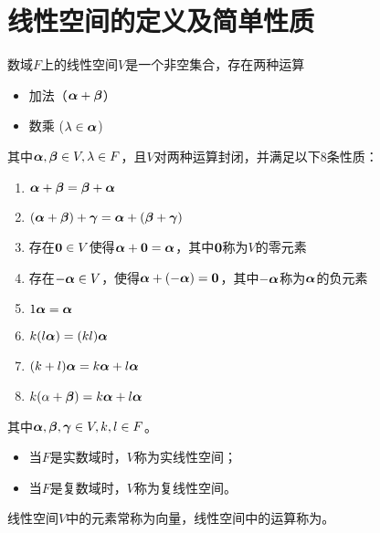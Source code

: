 
\section{线性空间的定义及简单性质}


\begin{frame}
\begin{dingyi}
数域$F$上的线性空间$V$是一个非空集合，存在两种运算
\begin{itemize}
\item 加法（$\boldsymbol{\alpha}+\boldsymbol{\beta}$）
\item 数乘 ($\lambda \in \boldsymbol{\alpha}$)
\end{itemize}
其中$\boldsymbol{\alpha},\boldsymbol{\beta} \in V, \lambda\in F$，且$V$对两种运算封闭，并满足以下$8$条性质：
\begin{enumerate}
\item $\boldsymbol{\alpha}+\boldsymbol{\beta}=\boldsymbol{\beta}+\boldsymbol{\alpha}$
\item $(\boldsymbol{\alpha}+\boldsymbol{\beta})+\boldsymbol{\gamma}=\boldsymbol{\alpha}+(\boldsymbol{\beta}+\boldsymbol{\gamma})$
\item 存在$\M0\in V$使得$\alphabd+\M0=\alphabd$，其中$\M0$称为$V$的零元素
\item 存在$-\boldsymbol{\alpha}\in V$，使得$\alphabd+(-\alphabd)=\M0$，其中$-\boldsymbol{\alpha}$称为$\boldsymbol{\alpha}$的负元素
\item $1\boldsymbol{\alpha} = \boldsymbol{\alpha}$
\item $k(l\boldsymbol{\alpha}) = (kl)\boldsymbol{\alpha}$
\item $(k+l)\boldsymbol{\alpha} = k\boldsymbol{\alpha} + l\boldsymbol{\alpha}$
\item $k(\alpha+\boldsymbol{\beta}) = k \boldsymbol{\alpha} + l \boldsymbol{\alpha}$
\end{enumerate}
其中$\boldsymbol{\alpha},\boldsymbol{\beta},\boldsymbol{\gamma}\in V, k, l \in F$。

\end{dingyi}
\end{frame}

\begin{frame}
  \begin{itemize}
    \item 当$F$是实数域时，$V$称为实线性空间；\\[0.2in]
    \item 当$F$是复数域时，$V$称为复线性空间。
  \end{itemize} \pause

  线性空间$V$中的元素常称为向量，线性空间中的运算称为。
\end{frame}

